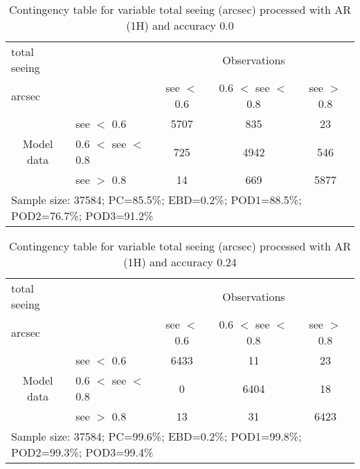 \documentclass[11pt,english]{article}
\begin{document}
\begin{table}[]
\begin{center}
\begin{tabular}{llccc}
\hline
{total seeing}                                       &                                                    & \multicolumn{3}{c}{Observations}                 \\
{arcsec}                                       &                             & see $<$ 0.6   & 0.6 $<$ see $<$ 0.8 & see $>$ 0.8 \\
\hline
\multicolumn{1}{c}{\multirow{3}{*}{Model data}}  & see $<$ 0.6             & 5707                & 835                       & 23              \\
                                                 & 0.6  $<$ see $<$ 0.8 & 725                & 4942                       & 546              \\
                                                 & see $>$ 0.8             & 14                & 669                       & 5877              \\
\hline
\multicolumn{5}{l}{Sample size: 37584; PC=85.5\%; EBD=0.2\%; POD1=88.5\%; POD2=76.7\%; POD3=91.2\%}
\end{tabular}
\end{center}
\caption{Contingency table for variable total seeing (arcsec) processed with AR (1H) and accuracy 0.0}
\label{tab:contingencyseeAFT}
\end{table}
\begin{table}[]
\begin{center}
\begin{tabular}{llccc}
\hline
{total seeing}                                       &                                                    & \multicolumn{3}{c}{Observations}                 \\
{arcsec}                                       &                             & see $<$ 0.6   & 0.6 $<$ see $<$ 0.8 & see $>$ 0.8 \\
\hline
\multicolumn{1}{c}{\multirow{3}{*}{Model data}}  & see $<$ 0.6             & 6433                & 11                       & 23              \\
                                                 & 0.6  $<$ see $<$ 0.8 & 0                & 6404                       & 18              \\
                                                 & see $>$ 0.8             & 13                & 31                       & 6423              \\
\hline
\multicolumn{5}{l}{Sample size: 37584; PC=99.6\%; EBD=0.2\%; POD1=99.8\%; POD2=99.3\%; POD3=99.4\%}
\end{tabular}
\end{center}
\caption{Contingency table for variable total seeing (arcsec) processed with AR (1H) and accuracy 0.24}
\label{tab:contingencyseeAFT}
\end{table}
\end{document}
